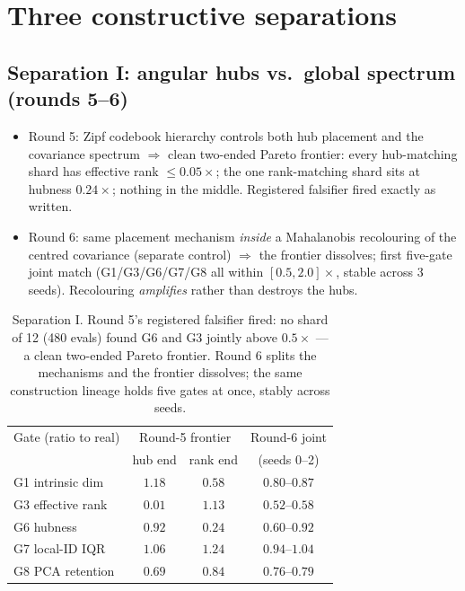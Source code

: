 \documentclass[11pt]{article}
\begin{document}
\section{Three constructive separations}\label{sec:separations}

\subsection{Separation I: angular hubs vs.\ global spectrum (rounds 5--6)}
\begin{itemize}
\item Round 5: Zipf codebook hierarchy controls both hub placement and the
  covariance spectrum $\Rightarrow$ clean two-ended Pareto frontier: every
  hub-matching shard has effective rank $\le 0.05\times$; the one rank-matching
  shard sits at hubness $0.24\times$; nothing in the middle. Registered
  falsifier fired exactly as written.
\item Round 6: same placement mechanism \emph{inside} a Mahalanobis
  recolouring of the centred covariance (separate control) $\Rightarrow$ the
  frontier dissolves; first five-gate joint match
  (G1/G3/G6/G7/G8 all within $[0.5,2.0]\times$, stable across 3 seeds).
  Recolouring \emph{amplifies} rather than destroys the hubs.
\end{itemize}

\begin{table}[h]\centering\small
\begin{tabular}{lccc}
\toprule
Gate (ratio to real) & \multicolumn{2}{c}{Round-5 frontier} & Round-6 joint \\
 & hub end & rank end & (seeds 0--2) \\
\midrule
G1 intrinsic dim      & $1.18$ & $0.58$ & $0.80$--$0.87$ \\
G3 effective rank     & $\mathbf{0.01}$ & $\mathbf{1.13}$ & $0.52$--$0.58$ \\
G6 hubness            & $\mathbf{0.92}$ & $\mathbf{0.24}$ & $0.60$--$0.92$ \\
G7 local-ID IQR       & $1.06$ & $1.24$ & $0.94$--$1.04$ \\
G8 PCA retention      & $0.69$ & $0.84$ & $0.76$--$0.79$ \\
\bottomrule
\end{tabular}
\caption{Separation I. Round 5's registered falsifier fired: no shard of 12
(480 evals) found G6 and G3 jointly above $0.5\times$ --- a clean two-ended
Pareto frontier. Round 6 splits the mechanisms and the frontier dissolves; the
same construction lineage holds five gates at once, stably across seeds.}
\label{tab:sep1}
\end{table}
\end{document}
